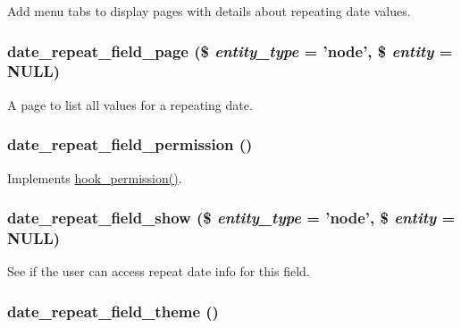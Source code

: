 Add menu tabs to display pages with details about repeating date values. \hypertarget{date__repeat__field_8module_ac4e5602e2806df2d48d309694c20819c}{
\subsubsection[{date\_\-repeat\_\-field\_\-page}]{\setlength{\rightskip}{0pt plus 5cm}date\_\-repeat\_\-field\_\-page (\$ {\em entity\_\-type} = {\ttfamily 'node'}, \/  \$ {\em entity} = {\ttfamily NULL})}}
\label{date__repeat__field_8module_ac4e5602e2806df2d48d309694c20819c}
A page to list all values for a repeating date. \hypertarget{date__repeat__field_8module_ad4075999ffe895631c565c8ae295e742}{
\subsubsection[{date\_\-repeat\_\-field\_\-permission}]{\setlength{\rightskip}{0pt plus 5cm}date\_\-repeat\_\-field\_\-permission ()}}
\label{date__repeat__field_8module_ad4075999ffe895631c565c8ae295e742}
Implements \hyperlink{group__hooks_ga2b22b45f4925f2478412477bae329713}{hook\_\-permission()}. \hypertarget{date__repeat__field_8module_adb20fc68338ed9fc0502c5b64dee6b69}{
\subsubsection[{date\_\-repeat\_\-field\_\-show}]{\setlength{\rightskip}{0pt plus 5cm}date\_\-repeat\_\-field\_\-show (\$ {\em entity\_\-type} = {\ttfamily 'node'}, \/  \$ {\em entity} = {\ttfamily NULL})}}
\label{date__repeat__field_8module_adb20fc68338ed9fc0502c5b64dee6b69}
See if the user can access repeat date info for this field. \hypertarget{date__repeat__field_8module_a7c686d7c8b75e0b277263535a9b6fbce}{
\subsubsection[{date\_\-repeat\_\-field\_\-theme}]{\setlength{\rightskip}{0pt plus 5cm}date\_\-repeat\_\-field\_\-theme ()}}
